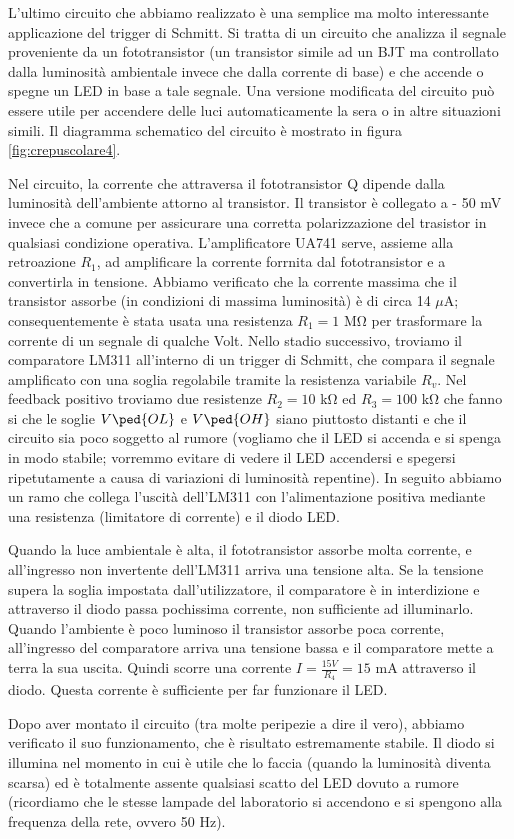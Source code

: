 L'ultimo circuito che abbiamo realizzato è una semplice ma molto interessante applicazione del trigger di Schmitt.
Si tratta di un circuito che analizza il segnale proveniente da un fototransistor
(un transistor simile ad un BJT ma controllato dalla luminosità ambientale invece che dalla corrente di base)
e che accende o spegne un LED in base a tale segnale. Una versione modificata del circuito può essere utile
per accendere delle luci automaticamente la sera o in altre situazioni simili. Il diagramma schematico del
circuito è mostrato in figura \ref{fig:crepuscolare4}.

Nel circuito, la corrente che attraversa il fototransistor Q dipende dalla luminosità dell'ambiente attorno al transistor.
Il transistor è collegato a - 50 mV invece che a comune per assicurare una corretta polarizzazione del trasistor in qualsiasi
condizione operativa. L'amplificatore UA741 serve, assieme alla retroazione $R_1$, ad amplificare la corrente forrnita dal
fototransistor e a convertirla in tensione. Abbiamo verificato che la corrente massima che il transistor assorbe (in condizioni di
massima luminosità) è di circa 14 $\mu$A; consequentemente è stata usata una resistenza $R_1 = 1$ \si{\mega\ohm} per trasformare
la corrente di un segnale di qualche Volt.
Nello stadio successivo, troviamo il comparatore LM311 all'interno di un trigger di Schmitt, che compara il segnale amplificato
con una soglia regolabile tramite la resistenza variabile $R_v$. Nel feedback positivo troviamo due resistenze $R_2 = 10$ \si{\kilo\ohm}
ed $R_3 = 100$ \si{\kilo\ohm} che fanno si che le soglie $V\ped{OL}$ e $V\ped{OH}$ siano piuttosto distanti e che il circuito
sia poco soggetto al rumore (vogliamo che il LED si accenda e si spenga in modo stabile; vorremmo evitare di vedere il LED
accendersi e spegersi ripetutamente a causa di variazioni di luminosità repentine). In seguito abbiamo un ramo che collega l'uscità
dell'LM311 con l'alimentazione positiva mediante una resistenza (limitatore di corrente) e il diodo LED.

Quando la luce ambientale è alta, il fototransistor assorbe molta corrente, e all'ingresso non invertente dell'LM311 arriva una
tensione alta. Se la tensione supera la soglia impostata dall'utilizzatore, il comparatore è in interdizione e attraverso il diodo
passa pochissima corrente, non sufficiente ad illuminarlo. Quando l'ambiente è poco luminoso il transistor assorbe poca corrente,
all'ingresso del comparatore arriva una tensione bassa e il comparatore mette a terra la sua uscita. Quindi scorre una corrente
$I = \frac{15 V}{R_4} = 15$ mA attraverso il diodo. Questa corrente è sufficiente per far funzionare il LED.

Dopo aver montato il circuito (tra molte peripezie a dire il vero), abbiamo verificato il suo funzionamento, che è risultato
estremamente stabile. Il diodo si illumina nel momento in cui è utile che lo faccia (quando la luminosità diventa scarsa)
ed è totalmente assente qualsiasi scatto del LED dovuto a rumore (ricordiamo che le stesse lampade del laboratorio si accendono
e si spengono alla frequenza della rete, ovvero 50 Hz).
